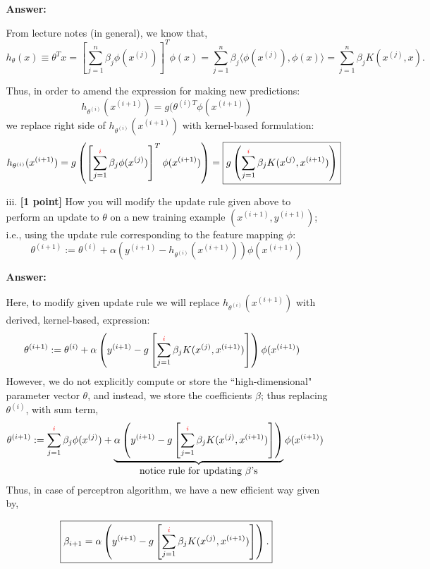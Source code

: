 \documentclass{article}
\begin{document}
\begin{enumerate}
\begin{enumerate}
\textbf{Answer:}

From lecture notes (in general), we know that,
\[
h_\theta(x)\equiv\theta^Tx = \left[\sum_{j=1}^{n}\beta_j\phi(x^{(j)})\right]^T\phi(x) = \sum_{j=1}^{n} \beta_j \langle\phi(x^{(j)}),\phi(x)\rangle = \sum_{j=1}^{n} \beta_jK(x^{(j)}, x).
\]
   
Thus, in order to amend the expression for making new predictions:
    \[h_{\theta^{(i)}} (x^{(i+1)}) = g(\theta^{(i)T} \phi(x^{(i+1)})
    \]
    we replace right side of $h_{\theta^{(i)}} (x^{(i+1)})$ with  kernel-based formulation:
   \[h_{\theta^{(i)}} (x^{(i+1)}) = g\left(\left[\sum_{j=1}^{{\color{red}i}}\beta_j\phi(x^{(j)})\right]^T\phi(x^{(i+1)})\right) = \boxed{g\left(\sum_{j=1}^{{\color{red}i}}\beta_jK(x^{(j)}, x^{(i+1)})\right)}
   \]


    \item[iii.] \textbf{[1 point]} How you will modify the update rule given above to perform an update to $\theta$ on a new training example $(x^{(i+1)},y^{(i+1)})$; i.e., using the update rule corresponding to the feature mapping $\phi$:
    \[
    \theta^{(i+1)} := \theta^{(i)} + \alpha \left( y^{(i+1)} - h_{\theta^{(i)}} (x^{(i+1)}) \right) \phi(x^{(i+1)}) 
    \]

    \textbf{Answer:}
    
    Here, to modify given update rule we will replace $h_{\theta^{(i)}} (x^{(i+1)})$ with derived, kernel-based, expression:
    \begin{align*}
            \theta^{(i+1)} &:=\theta^{(i)} + \alpha \left( y^{(i+1)} - g\left[\sum_{j=1}^{{\color{red}i}}\beta_jK(x^{(j)}, x^{(i+1)})\right]\right)\phi(x^{(i+1)})
    \end{align*}
However, we do not explicitly compute or store the ``high-dimensional" parameter vector $\theta$, and instead, we store the coefficients $\beta$; thus replacing $\theta^{(i)}$, with sum term,
\begin{align*}
\theta^{(i+1)} &:= \sum_{j=1}^{{\color{red}i}}\beta_j\phi(x^{(j)}) + \underbrace{\alpha \left( y^{(i+1)} - g\left[\sum_{j=1}^{{\color{red}i}}\beta_jK(x^{(j)}, x^{(i+1)})\right] \right) }_{\mbox{notice rule for updating  $\beta$'s}}\phi(x^{(i+1)})
\end{align*}
Thus, in case of perceptron algorithm, we have a new efficient way given by,

\[
\boxed{\beta_{i+1} = \alpha \left( y^{(i+1)} - g\left[\sum_{j=1}^{{\color{red}i}}\beta_jK(x^{(j)}, x^{(i+1)})\right]\right).}
\]


\end{enumerate}
\end{enumerate}
\end{document}
